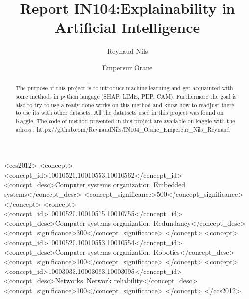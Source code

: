 \documentclass[sigplan,screen]{acmart}
\begin{document}
\title{Report IN104:Explainability in Artificial Intelligence}

\author{Reynaud Nils}
\author{Empereur Orane}
\begin{abstract}
\large
The purpose of this project is to introduce machine learning and get acquainted with some methods in python langage (SHAP, LIME, PDP, CAM). Furthermore the goal is also to try to use already done works on this method and know how to readjust there to use its with other datasets. All the datatsets used in this project was found on Kaggle. The code of method presented in this project are available on kaggle with the adress : 
\small
https://github.com/ReynaudNils/IN104_Orane_Empereur_Nils_Reynaud
\end{abstract}

\begin{CCSXML}
<ccs2012>
 <concept>
  <concept_id>10010520.10010553.10010562</concept_id>
  <concept_desc>Computer systems organization~Embedded systems</concept_desc>
  <concept_significance>500</concept_significance>
 </concept>
 <concept>
  <concept_id>10010520.10010575.10010755</concept_id>
  <concept_desc>Computer systems organization~Redundancy</concept_desc>
  <concept_significance>300</concept_significance>
 </concept>
 <concept>
  <concept_id>10010520.10010553.10010554</concept_id>
  <concept_desc>Computer systems organization~Robotics</concept_desc>
  <concept_significance>100</concept_significance>
 </concept>
 <concept>
  <concept_id>10003033.10003083.10003095</concept_id>
  <concept_desc>Networks~Network reliability</concept_desc>
  <concept_significance>100</concept_significance>
 </concept>
</ccs2012>
\end{CCSXML}



\end{document}
